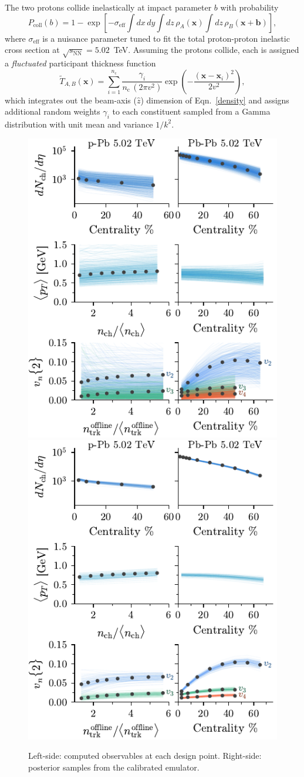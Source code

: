 \documentclass[3p,times,procedia,sort&compress]{elsarticle}
\newcommand{\sqrts}{\sqrt{s_\mathrm{NN}}}
\newcommand{\nc}{n_\mathrm{c}}
\newcommand{\T}{\tilde{T}}
\begin{document}
The two protons collide inelastically at impact parameter $b$ with probability
\begin{equation}
  \label{pcoll}
  P_\text{coll}(b) = 1 - \exp\left[-\sigma_\text{eff} \int dx\,dy \int dz\, \rho_A(\mathbf{x}) \int dz\, \rho_B(\mathbf{x} + \mathbf{b}) \right],
\end{equation}
where $\sigma_\text{eff}$ is a nuisance parameter tuned to fit the total proton-proton inelastic cross section at \mbox{$\sqrts=5.02$~TeV}.
Assuming the protons collide, each is assigned a \emph{fluctuated} participant thickness function
\begin{equation}
  \label{part}
  \T_{A,B}(\mathbf{x}) = \sum\limits_{i=1}^{\nc} \frac{\gamma_i}{\nc\, (2 \pi v^2)} \exp\left(-\frac{(\textbf{x}-\textbf{x}_i)^2}{2 v^2}\right),
\end{equation}
which integrates out the beam-axis ($\hat{z}$) dimension of Eqn.~\eqref{density} and assigns additional random weights $\gamma_i$ to each constituent sampled from a Gamma distribution with unit mean and variance $1/k^2$.

\begin{figure}
  \includegraphics[width=.5\textwidth]{observables_design}
  \includegraphics[width=.5\textwidth]{observables_posterior}
  \caption{\label{fig:calibration} Left-side: computed observables at each design point. Right-side: posterior samples from the calibrated emulator.}
\end{figure}
\end{document}
